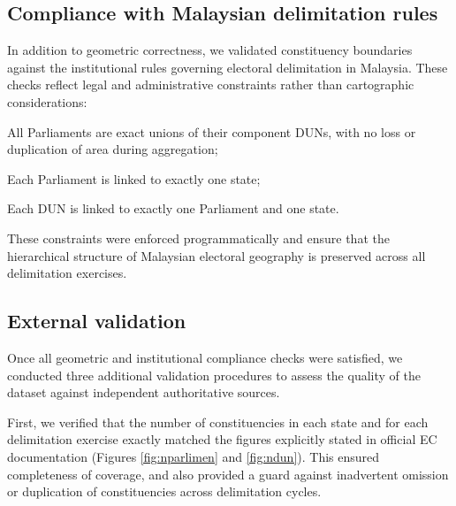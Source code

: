 \documentclass[11pt]{article}
\begin{document}
\subsection*{Compliance with Malaysian delimitation rules}

In addition to geometric correctness, we validated constituency boundaries against the institutional rules governing electoral delimitation in Malaysia. These checks reflect legal and administrative constraints rather than cartographic considerations:

\begin{enumbul}
	\item All Parliaments are exact unions of their component DUNs, with no loss or duplication of area during aggregation;
	\item Each Parliament is linked to exactly one state;
	\item Each DUN is linked to exactly one Parliament and one state.
\end{enumbul}

These constraints were enforced programmatically and ensure that the hierarchical structure of Malaysian electoral geography is preserved across all delimitation exercises.

\subsection*{External validation}

Once all geometric and institutional compliance checks were satisfied, we conducted three additional validation procedures to assess the quality of the dataset against independent authoritative sources.

First, we verified that the number of constituencies in each state and for each delimitation exercise exactly matched the figures explicitly stated in official EC documentation (Figures \ref{fig:nparlimen} and \ref{fig:ndun}). This ensured completeness of coverage, and also provided a guard against inadvertent omission or duplication of constituencies across delimitation cycles.
\end{document}
